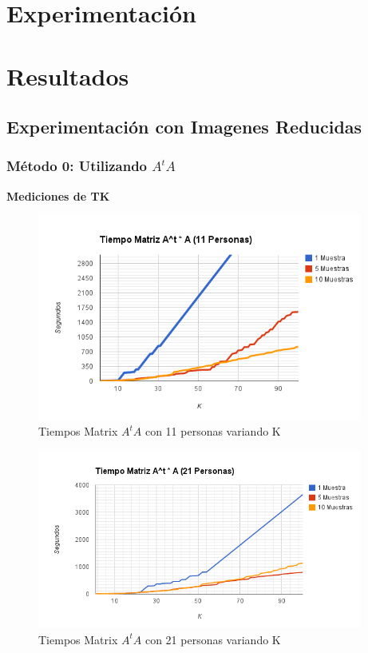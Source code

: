 \section{Experimentación}


\section{Resultados}
\subsection{Experimentaci\'on con Imagenes Reducidas}
\subsubsection{M\'etodo 0: Utilizando $A^tA$}

\textbf{Mediciones de TK}
\begin{figure}[H]
\includegraphics[width=0.95\textwidth]{img/image1.png}
     \caption{Tiempos Matrix $A^tA$ con 11 personas variando K}
\end{figure}

\begin{figure}[H]
\includegraphics[width=0.95\textwidth]{img/image2.png}
     \caption{Tiempos Matrix $A^tA$ con 21 personas variando K}
\end{figure}

